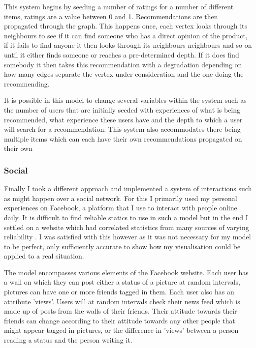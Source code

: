 \documentclass[12pt,a4paper]{article}
\begin{document}
This system begins by seeding a number of ratings for a number of different items, ratings are a value between 0 and 1. Recommendations are then propagated through the graph. This happens once, each vertex looks through its neighbours to see if it can find someone who has a direct opinion of the product, if it fails to find anyone it then looks through its neighbours neighbours and so on until it either finds someone or reaches a pre-determined depth. If it does find somebody it then takes this recommendation with a degradation depending on how many edges separate the vertex under consideration and the one doing the recommending.

It is possible in this model to change several variables within the system such as the number of users that are initially seeded with experiences of what is being recommended, what experience these users have and the depth to which a user will search for a recommendation. This system also accommodates there being multiple items which can each have their own recommendations propagated on their own

\subsubsection{Social}

Finally I took a different approach and implemented a system of interactions such as might happen over a social network. For this I primarily used my personal experiences on Facebook, a platform that I use to interact with people online daily. It is difficult to find reliable statics to use in such a model but in the end I settled on a website which had correlated statistics from many sources of varying reliability \cite{facebookStats}. I was satisfied with this however as it was not necessary for my model to be perfect, only sufficiently accurate to show how my visualisation could be applied to a real situation.

The model encompasses various elements of the Facebook website. Each user has a wall on which they can post either a status of a picture at random intervals, pictures can have one or more friends tagged in them. Each user also has an attribute 'views'. Users will at random intervals check their news feed which is made up of posts from the walls of their friends. Their attitude towards their friends can change according to their attitude towards any other people that might appear tagged in pictures, or the difference in 'views' between a person reading a status and the person writing it.
\end{document}
